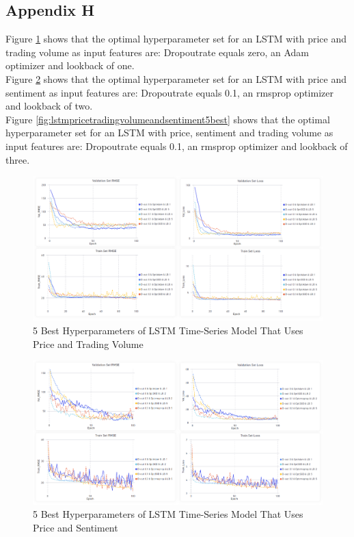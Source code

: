 \documentclass[11pt, a4paper]{article}
\begin{document}
\subsection{Appendix H}
\label{appendix:Graphics}
Figure \ref{fig:lstmpricetradingvolume5best} shows that the optimal hyperparameter set for an LSTM with price and trading
volume as input features are: Dropoutrate equals zero, an Adam optimizer and lookback of one.\\
Figure \ref{fig:lstmpricenotradingvolume5best} shows that the optimal hyperparameter set for an LSTM with price and
sentiment as input features are: Dropoutrate equals 0.1, an rmsprop optimizer and lookback of two.\\
Figure \ref{fig:lstmpricetradingvolumeandsentiment5best} shows that the optimal hyperparameter set for an LSTM with price,
sentiment and trading volume as input features are: Dropoutrate equals 0.1, an rmsprop optimizer and lookback of three.


\begin{figure}[!h]
    \centering
    \includegraphics[width=\textwidth]{Only_Trading_Volume.png}
    \caption{5 Best Hyperparameters of LSTM Time-Series Model That Uses Price and Trading Volume}
    \label{fig:lstmpricetradingvolume5best}
\end{figure}

\begin{figure}[!h]
    \centering
    \includegraphics[width=\textwidth]{Only_Sentiment.png}
    \caption{5 Best Hyperparameters of LSTM Time-Series Model That Uses Price and Sentiment}
    \label{fig:lstmpricenotradingvolume5best}
\end{figure}
\end{document}
